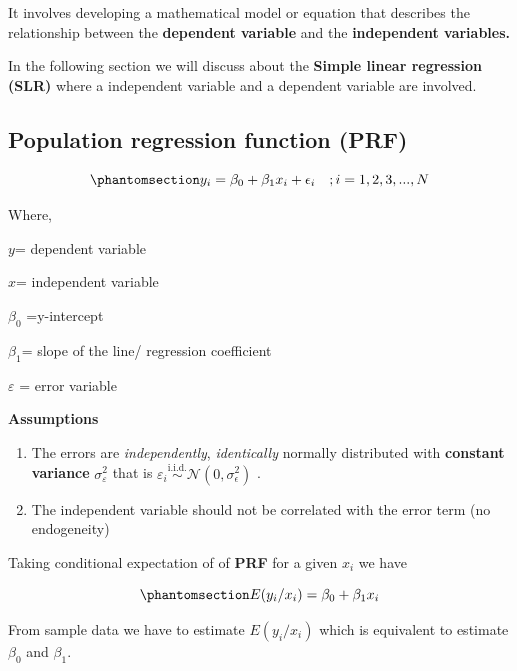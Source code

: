\documentclass[
  11pt,
  letterpaper,
  DIV=11,
  numbers=noendperiod]{scrreprt}
\begin{document}
It involves developing a mathematical model or equation that describes
the relationship between the \textbf{dependent variable} and the
\textbf{independent variables.}

In the following section we will discuss about the \textbf{Simple linear
regression (SLR)} where a independent variable and a dependent variable
are involved.

\subsection{\texorpdfstring{\textbf{Population regression function
(PRF)}}{Population regression function (PRF)}}\label{population-regression-function-prf}

\begin{equation}\phantomsection\label{eq-PRF}{y_i=\beta_0+\beta_1 x_i+\epsilon_i \hspace{10pt} ; i=1,2,3,..., N}\end{equation}

Where,

\(y\)= dependent variable

\(x\)= independent variable

\(\beta_0\) =y-intercept

\(\beta_1\)= slope of the line/ regression coefficient

\(\varepsilon\) = error variable

\textbf{Assumptions}

\begin{enumerate}
\def\labelenumi{\roman{enumi})}
\item
  The errors are \emph{independently}, \emph{identically} normally
  distributed with \textbf{constant variance} \(\sigma_\varepsilon ^2\)
  that is
  \(\varepsilon_i \overset{\text{i.i.d.}}{\sim} \mathcal{N}(0, \sigma_\epsilon^2)\)
  .
\item
  The independent variable should not be correlated with the error term
  (no endogeneity)
\end{enumerate}

Taking conditional expectation of of \textbf{PRF} for a given \(x_i\) we
have

\begin{equation}\phantomsection\label{eq-expectedprf}{E(y_i/x_i)=\beta_0+\beta_1 x_i }\end{equation}

From sample data we have to estimate \(E(y_i/x_i)\) which is equivalent
to estimate \(\beta_0\) and \(\beta_1\).
\end{document}
